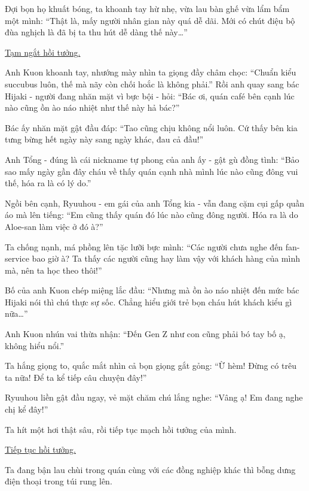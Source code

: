 \documentclass[../main.tex]{subfiles}
\begin{document}
Đợi bọn họ khuất bóng, ta khoanh tay hừ nhẹ, vừa lau bàn ghế vừa lẩm bẩm một mình: ``Thật là, mấy người nhân gian này quá dễ dãi. Mới có chút điệu bộ đùa nghịch là đã bị ta thu hút dễ dàng thế này\dots''

\begin{center}
  \uline{Tạm ngắt hồi tưởng.}
\end{center}

Anh Kuon khoanh tay, nhướng mày nhìn ta giọng đầy châm chọc: ``Chuẩn kiểu succubus luôn, thế mà nãy còn chối hoắc là không phải.'' Rồi anh quay sang bác Hijaki - người đang nhăn mặt vì bực bội - hỏi: ``Bác ơi, quán café bên cạnh lúc nào cũng ồn ào náo nhiệt như thế này hả bác?''

Bác ấy nhăn mặt gật đầu đáp: ``Tao cũng chịu không nổi luôn. Cứ thấy bên kia tưng bừng hết ngày này sang ngày khác, đau cả đầu!''

Anh Tổng - đúng là cái nickname tự phong của anh ấy - gật gù đồng tình: ``Bảo sao mấy ngày gần đây cháu về thấy quán cạnh nhà mình lúc nào cũng đông vui thế, hóa ra là có lý do.''

Ngồi bên cạnh, Ryuuhou - em gái của anh Tổng kia - vẫn đang cặm cụi gấp quần áo mà lên tiếng: ``Em cũng thấy quán đó lúc nào cũng đông người. Hóa ra là do Aloe-san làm việc ở đó à?''

Ta chống nạnh, má phồng lên tặc lưỡi bực mình: ``Các người chưa nghe đến fan-service bao giờ à? Ta thấy các người cũng hay làm vậy với khách hàng của mình mà, nên ta học theo thôi!''

Bố của anh Kuon chép miệng lắc đầu: ``Nhưng mà ồn ào náo nhiệt đến mức bác Hijaki nói thì chú thực sự sốc. Chẳng hiểu giới trẻ bọn cháu hút khách kiểu gì nữa\dots''

Anh Kuon nhún vai thừa nhận: ``Đến Gen Z như con cũng phải bó tay bố ạ, không hiểu nổi.''

Ta hắng giọng to, quắc mắt nhìn cả bọn giọng gắt gỏng: ``Ừ hèm! Đừng có trêu ta nữa! Để ta kể tiếp câu chuyện đây!''

Ryuuhou liền gật đầu ngay, vẻ mặt chăm chú lắng nghe: ``Vâng ạ! Em đang nghe chị kể đây!''

Ta hít một hơi thật sâu, rồi tiếp tục mạch hồi tưởng của mình.

\begin{center}
  \uline{Tiếp tục hồi tưởng.}
\end{center}

Ta đang bận lau chùi trong quán cùng với các đồng nghiệp khác thì bỗng dưng điện thoại trong túi rung lên.
\end{document}
